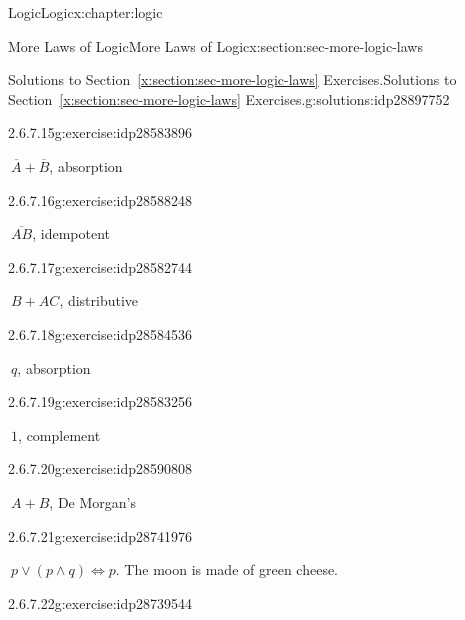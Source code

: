 \documentclass[twoside,10pt,]{book}
\newcommand{\xreffont}{\relax}
\numberwithin{equation}{section}
\begin{document}
\begin{chapterptx}{Logic}{}{Logic}{}{}{x:chapter:logic}
\begin{sectionptx}{More Laws of Logic}{}{More Laws of Logic}{}{}{x:section:sec-more-logic-laws}
\begin{solutions-subsection}{Solutions to Section~{\xreffont\ref*{x:section:sec-more-logic-laws}} Exercises.}{}{Solutions to Section~{\xreffont\ref*{x:section:sec-more-logic-laws}} Exercises.}{}{}{g:solutions:idp28897752}
\begin{exercisegroup}
\end{exercisegroup}
\par\medskip\noindent
\begin{exercisegroup}
\begin{divisionsolutioneg}{2.6.7.15}{}{g:exercise:idp28583896}%
\par\smallskip%
\noindent\hypertarget{g:solution:idp28585048-main}{}\(\ \overline{A}{}+ \overline{B}{}\), absorption\end{divisionsolutioneg}%
\begin{divisionsolutioneg}{2.6.7.16}{}{g:exercise:idp28588248}%
\par\smallskip%
\noindent\hypertarget{g:solution:idp28584024-main}{}\(\ \overline{AB}\), idempotent\end{divisionsolutioneg}%
\begin{divisionsolutioneg}{2.6.7.17}{}{g:exercise:idp28582744}%
\par\smallskip%
\noindent\hypertarget{g:solution:idp28583768-main}{}\(\ B+AC \), distributive\end{divisionsolutioneg}%
\begin{divisionsolutioneg}{2.6.7.18}{}{g:exercise:idp28584536}%
\par\smallskip%
\noindent\hypertarget{g:solution:idp28582872-main}{}\(\ q\), absorption\end{divisionsolutioneg}%
\begin{divisionsolutioneg}{2.6.7.19}{}{g:exercise:idp28583256}%
\par\smallskip%
\noindent\hypertarget{g:solution:idp28590168-main}{}\(\ 1\), complement\end{divisionsolutioneg}%
\begin{divisionsolutioneg}{2.6.7.20}{}{g:exercise:idp28590808}%
\par\smallskip%
\noindent\hypertarget{g:solution:idp28590424-main}{}\(\ A+B\), De Morgan's\end{divisionsolutioneg}%
\end{exercisegroup}
\par\medskip\noindent
\begin{exercisegroup}
\begin{divisionsolutioneg}{2.6.7.21}{}{g:exercise:idp28741976}%
\par\smallskip%
\noindent\hypertarget{g:solution:idp28742488-main}{}\(\ p {\vee}{} (p {\wedge}{} q) {\Leftrightarrow}{}  p\). The moon is made of green cheese.\end{divisionsolutioneg}%
\begin{divisionsolutioneg}{2.6.7.22}{}{g:exercise:idp28739544}%

\end{divisionsolutioneg}
\end{exercisegroup}
\end{solutions-subsection}
\end{sectionptx}
\end{chapterptx}
\end{document}
